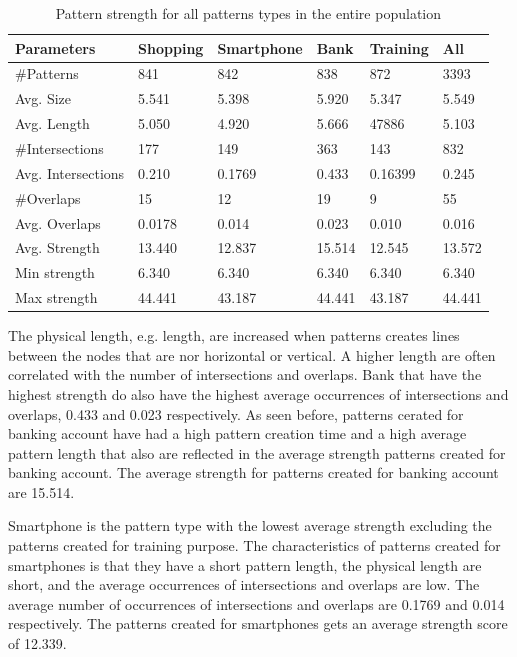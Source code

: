     \begin{table}[H]
      \begin{tabular}{l || l | l | l | l || l}
        \hline
        {\bf Parameters} & {\bf Shopping} & {\bf Smartphone} & {\bf Bank} & {\bf Training} & {\bf All} \\ \hline
        \#Patterns & 841 & 842 & 838 & 872 & 3393 \\
        Avg. Size & 5.541 & 5.398 & 5.920 & 5.347 & 5.549 \\ 
        Avg. Length & 5.050 & 4.920 & 5.666 & 47886 & 5.103 \\
        \#Intersections & 177 & 149 & 363 & 143 & 832 \\
        Avg. Intersections & 0.210 & 0.1769 & 0.433 & 0.16399 & 0.245 \\
        \#Overlaps & 15 & 12 & 19 & 9 & 55 \\
        Avg. Overlaps & 0.0178 & 0.014 & 0.023 & 0.010 & 0.016\\ \hline
        Avg. Strength & 13.440 & 12.837 & 15.514 & 12.545 & 13.572 \\ 
        Min strength & 6.340 & 6.340 & 6.340 & 6.340 & 6.340 \\
        Max strength & 44.441 & 43.187 & 44.441 & 43.187 & 44.441 \\ \hline
      \end{tabular}
      \caption{Pattern strength for all patterns types in the entire population}
      \label{tab:patternstrength}
    \end{table}

    The physical length, e.g. length, are increased when patterns creates lines between the nodes that are nor horizontal or vertical. A higher length are often correlated with the number of intersections and overlaps. Bank that have the highest strength do also have the highest average occurrences of intersections and overlaps, 0.433 and 0.023 respectively. 
    As seen before, patterns cerated for banking account have had a high pattern creation time and a high average pattern length that also are reflected in the average strength patterns created for banking account. The average strength for patterns created for banking account are 15.514.

    Smartphone is the pattern type with the lowest average strength excluding the patterns created for training purpose. The characteristics of patterns created for smartphones is that they have a short pattern length, the physical length are short, and the average occurrences of intersections and overlaps are low. The average number of occurrences of intersections and overlaps are 0.1769 and 0.014 respectively. The patterns created for smartphones gets an average strength score of 12.339. 

